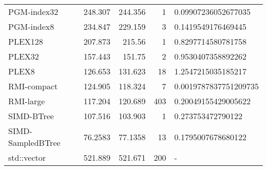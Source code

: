 \begin{tabular}{lrrrl}
 PGM-index32       &               248.307  &              244.356  &            1 & 0.09907236052677035   \\
 PGM-index8        &               234.847  &              229.159  &            3 & 0.1419549176469445    \\
 PLEX128           &               207.873  &              215.56   &            1 & 0.8297714580781758    \\
 PLEX32            &               157.443  &              151.75   &            2 & 0.9530407358892262    \\
 PLEX8             &               126.653  &              131.623  &           18 & 1.2547215035185217    \\
 RMI-compact       &               124.905  &              118.324  &            7 & 0.0019787837751209735 \\
 RMI-large         &               117.204  &              120.689  &          403 & 0.20049155429005622   \\
 SIMD-BTree        &               107.516  &              103.903  &            1 & 0.273753472790122     \\
 SIMD-SampledBTree &                76.2583 &               77.1358 &           13 & 0.1795007678680122    \\
 std::vector       &               521.889  &              521.671  &          200 & -                     \\
\hline
\end{tabular}